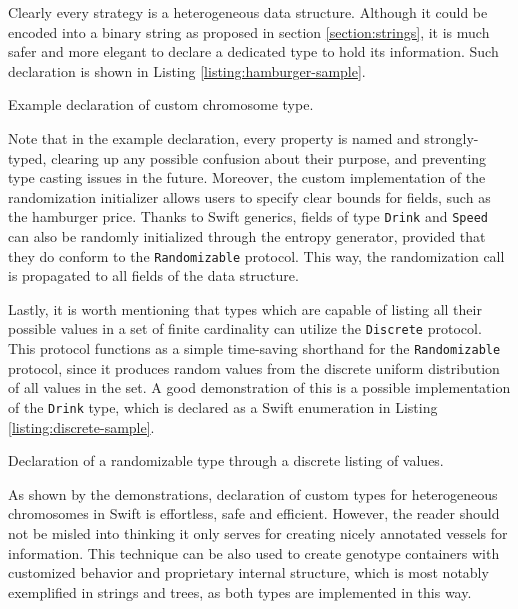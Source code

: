 Clearly every strategy is a heterogeneous data structure. Although it could be encoded into a binary string as proposed in section \ref{section:strings}, it is much safer and more elegant to declare a dedicated type to hold its information. Such declaration is shown in Listing \ref{listing:hamburger-sample}.

\begin{listing}[ht]
	\caption{Example declaration of custom chromosome type.}
	\label{listing:hamburger-sample}
\end{listing}

Note that in the example declaration, every property is named and strongly-typed, clearing up any possible confusion about their purpose, and preventing type casting issues in the future. Moreover, the custom implementation of the randomization initializer allows users to specify clear bounds for fields, such as the hamburger price. Thanks to Swift generics, fields of type \texttt{Drink} and \texttt{Speed} can also be randomly initialized through the entropy generator, provided that they do conform to the \texttt{Randomizable} protocol. This way, the randomization call is propagated to all fields of the data structure.

Lastly, it is worth mentioning that types which are capable of listing all their possible values in a set of finite cardinality can utilize the \texttt{Discrete} protocol. This protocol functions as a simple time-saving shorthand for the \texttt{Randomizable} protocol, since it produces random values from the discrete uniform distribution of all values in the set. A good demonstration of this is a possible implementation of the \texttt{Drink} type, which is declared as a Swift enumeration in Listing \ref{listing:discrete-sample}.

\begin{listing}[ht]
	\caption{Declaration of a randomizable type through a discrete listing of values.}
	\label{listing:discrete-sample}
\end{listing}

As shown by the demonstrations, declaration of custom types for heterogeneous chromosomes in Swift is effortless, safe and efficient. However, the reader should not be misled into thinking it only serves for creating nicely annotated vessels for information. This technique can be also used to create genotype containers with customized behavior and proprietary internal structure, which is most notably exemplified in strings and trees, as both types are implemented in this way.

